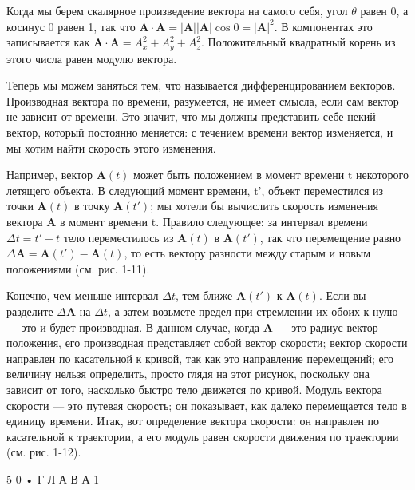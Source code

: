 \documentclass[10pt,oneside]{article}
\newcommand{\TipsSubsection}[1]{\par\vspace{6bp}{\normalsize\bfseries #1\par}\vspace{2bp}}
\begin{document}
Когда мы берем скалярное произведение вектора на самого себя, угол \(\theta\) равен 0, а косинус 0 равен 1, так что \(\mathbf{A} \cdot \mathbf{A} = |\mathbf{A}| |\mathbf{A}| \cos 0 = |\mathbf{A}|^2\). В компонентах это записывается как \(\mathbf{A} \cdot \mathbf{A} = A_x^2 + A_y^2 + A_z^2\). Положительный квадратный корень из этого числа равен модулю вектора.\par

\TipsSubsection{1-7 Дифференцирование векторов}

Теперь мы можем заняться тем, что называется дифференцированием векторов. Производная вектора по времени, разумеется, не имеет смысла, если сам вектор не зависит от времени. Это значит, что мы должны представить себе некий вектор, который постоянно меняется: с течением времени вектор изменяется, и мы хотим найти скорость этого изменения.\par

Например, вектор \(\mathbf{A}(t)\) может быть положением в момент времени t некоторого летящего объекта. В следующий момент времени, t', объект переместился из точки \(\mathbf{A}(t)\) в точку \(\mathbf{A}(t')\); мы хотели бы вычислить скорость изменения вектора \(\mathbf{A}\) в момент времени t. Правило следующее: за интервал времени \(\Delta t = t' - t\) тело переместилось из \(\mathbf{A}(t)\) в \(\mathbf{A}(t')\), так что перемещение равно \(\Delta\mathbf{A} = \mathbf{A}(t') - \mathbf{A}(t)\), то есть вектору разности между старым и новым положениями (см. рис. 1-11).\par

Конечно, чем меньше интервал \(\Delta t\), тем ближе \(\mathbf{A}(t')\) к \(\mathbf{A}(t)\). Если вы разделите \(\Delta\mathbf{A}\) на \(\Delta t\), а затем возьмете предел при стремлении их обоих к нулю --- это и будет производная. В данном случае, когда \(\mathbf{A}\) --- это радиус-вектор положения, его производная представляет собой вектор скорости; вектор скорости направлен по касательной к кривой, так как это направление перемещений; его величину нельзя определить, просто глядя на этот рисунок, поскольку она зависит от того, насколько быстро тело движется по кривой. Модуль вектора скорости --- это путевая скорость; он показывает, как далеко перемещается тело в единицу времени. Итак, вот определение вектора скорости: он направлен по касательной к траектории, а его модуль равен скорости движения по траектории (см. рис. 1-12).\par

5 0 • Г Л А В А   1\par
\end{document}
